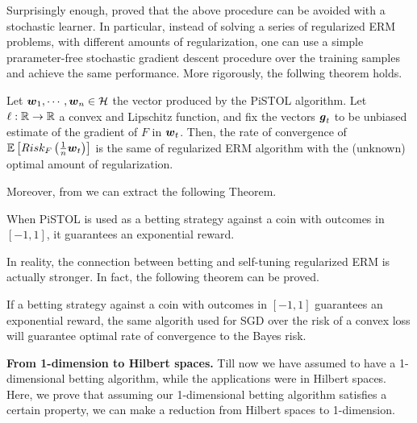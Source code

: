 Surprisingly enough, \citep{Orabona14} proved that the above procedure can be avoided with a stochastic learner. In particular, instead of solving a series of regularized ERM problems, with different amounts of regularization, one can use a simple prarameter-free stochastic gradient descent procedure over the training samples and achieve the same performance.
More rigorously, the follwing theorem holds.
\begin{theorem}
Let $\boldsymbol{w}_1, \cdots, \boldsymbol{w}_n \in \mathcal{H}$ the vector produced by the PiSTOL algorithm.
Let $\ell:\mathbb{R}\rightarrow\mathbb{R}$ a convex and Lipschitz function, and fix the vectors $\boldsymbol{g}_t$ to be unbiased estimate of the gradient of $F$ in $\boldsymbol{w}_t$. Then, the rate of convergence of $\mathbb{E}\left[Risk_F\left(\frac{1}{n} \boldsymbol{w}_t\right)\right]$ is the same of regularized ERM algorithm with the (unknown) optimal amount of regularization.
\end{theorem}

Moreover, from \citep{} we can extract the following Theorem.
\begin{theorem}
When PiSTOL is used as a betting strategy against a coin with outcomes in $[-1,1]$, it guarantees an exponential reward.
\end{theorem}

In reality, the connection between betting and self-tuning regularized ERM is actually stronger. In fact, the following theorem can be proved.
\begin{theorem}
If a betting strategy against a coin with outcomes in $[-1,1]$ guarantees an exponential reward, the same algorith used for SGD over the risk of a convex loss will guarantee optimal rate of convergence to the Bayes risk.
\end{theorem}


\textbf{From 1-dimension to Hilbert spaces.}
Till now we have assumed to have a 1-dimensional betting algorithm, while the applications were in Hilbert spaces. Here, we prove that assuming our 1-dimensional betting algorithm satisfies a certain property, we can make a reduction from Hilbert spaces to 1-dimension.

